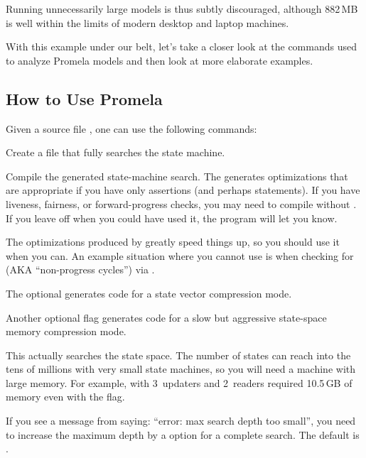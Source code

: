 Running unnecessarily large models is thus subtly discouraged, although
882\,MB is well within the limits of modern desktop and laptop machines.

With this example under our belt, let's take a closer look at the
commands used to analyze Promela models and then look at more
elaborate examples.

\subsection{How to Use Promela}
\label{sec:formal:How to Use Promela}

Given a source file , one can use the following commands:

\begin{description}[style=nextline]
\item	[\tco{spin -a qrcu.spin}]
	Create a file  that fully searches the state machine.
\item	[\tco{cc -DSAFETY [-DCOLLAPSE] [-DMA=N] -o pan pan.c}]
	Compile the generated state-machine search.
	The  generates optimizations that are appropriate
        if you have only assertions (and perhaps  statements).
	If you have liveness, fairness, or forward-progress checks,
	you may need to compile without .
	If you leave off  when you could have used it,
	the program will let you know.

	The optimizations produced by  greatly speed things
	up, so you should use it when you can.
	An example situation where you cannot use  is
	when checking for  (AKA ``non-progress cycles'')
	via .

	The optional  generates code for a state vector
	compression mode.

	Another optional flag  generates code for a slow
	but aggressive state-space memory compression mode.
\item	[\tco{./pan [-mN] [-wN]}]
	This actually searches the state space.
	The number of states can reach into the tens of millions with
	very small state machines, so you will need a machine with
	large memory.
	For example,  with 3~updaters and 2~readers required
	10.5\,GB of memory even with the  flag.

	If you see a message from  saying:
	``error: max search depth too small'', you need to increase
	the maximum depth by a  option for a complete search.
	The default is .


\end{description}
